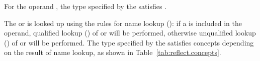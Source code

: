 \begin{std.txt}
\pnum
For the operand \tcode{::}, the type specified by the
 satisfies .

\pnum
The  or  is looked up
using the rules for name lookup (): if a
 is included in the operand, qualified lookup
() of  or
 will be performed,
otherwise unqualified lookup () of
 or  will be performed.
The type specified by the  satisfies concepts
depending on the result of name lookup, as shown in
Table~\ref{tab:reflect.concepts}.

\setcounter{table}{11}


\end{std.txt}
